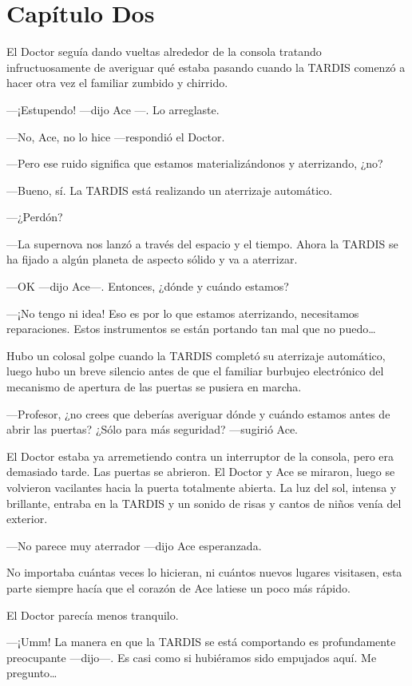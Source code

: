 \chapter*{Capítulo Dos}

El Doctor seguía dando vueltas alrededor de la consola tratando
infructuosamente de averiguar qué estaba pasando cuando la TARDIS
comenzó a hacer otra vez el familiar zumbido y chirrido. 

---¡Estupendo! ---dijo Ace ---. Lo arreglaste.

---No, Ace, no lo hice ---respondió el Doctor.

---Pero ese ruido significa que estamos materializándonos y
aterrizando, ¿no?

---Bueno, sí. La TARDIS está realizando un aterrizaje
automático.

---¿Perdón?

---La supernova nos lanzó a través del espacio y el tiempo.
Ahora la TARDIS se ha fijado a algún planeta de aspecto sólido y va a
aterrizar.

---OK ---dijo Ace---. Entonces, ¿dónde y cuándo estamos?

---¡No tengo ni idea! Eso es por lo que estamos aterrizando,
necesitamos reparaciones. Estos instrumentos se están portando tan mal
que no puedo\ldots{}

Hubo un colosal golpe cuando la TARDIS completó su aterrizaje
automático, luego hubo un breve silencio antes de que el familiar
burbujeo electrónico del mecanismo de apertura de las puertas se pusiera
en marcha.

---Profesor, ¿no crees que deberías averiguar dónde y cuándo
estamos antes de abrir las puertas? ¿Sólo para más seguridad? ---sugirió
Ace.

El Doctor estaba ya arremetiendo contra un interruptor de la
consola, pero era demasiado tarde. Las puertas se abrieron. El Doctor y
Ace se miraron, luego se volvieron vacilantes hacia la puerta totalmente
abierta. La luz del sol, intensa y brillante, entraba en la TARDIS y un
sonido de risas y cantos de niños venía del exterior.

---No parece muy aterrador ---dijo Ace esperanzada.

No importaba cuántas veces lo hicieran, ni cuántos nuevos
lugares visitasen, esta parte siempre hacía que el corazón de Ace
latiese un poco más rápido.

El Doctor parecía menos tranquilo.

---¡Umm! La manera en que la TARDIS se está comportando es
profundamente preocupante ---dijo---. Es casi como si hubiéramos sido
empujados aquí. Me pregunto\ldots{}

